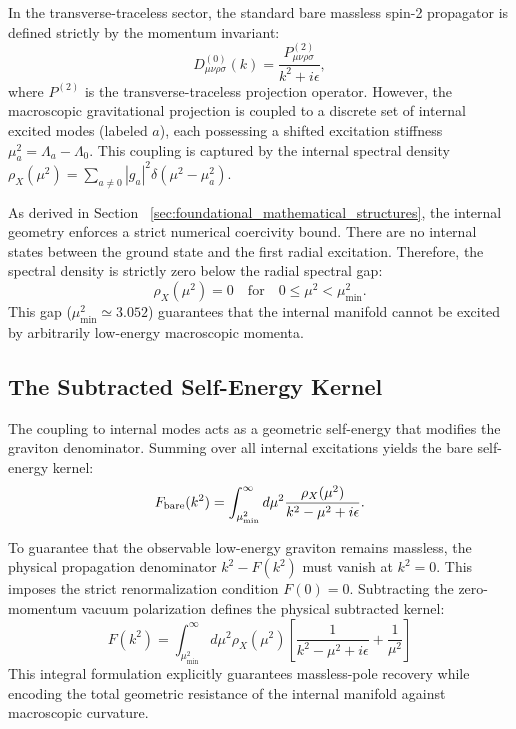 \documentclass[11pt]{article}
\begin{document}
In the transverse-traceless sector, the standard bare massless spin-2 propagator\cite{tHooft1974} is defined strictly by the momentum invariant:
\begin{equation}
D^{(0)}_{\mu\nu\rho\sigma}(k) = \frac{P_{\mu\nu\rho\sigma}^{(2)}}{k^2 + i\epsilon},
\end{equation}
where $P^{(2)}$ is the transverse-traceless projection operator. However, the macroscopic gravitational projection is coupled to a discrete set of internal excited modes (labeled $a$), each possessing a shifted excitation stiffness $\mu_a^2 = \Lambda_a - \Lambda_0$. This coupling is captured by the internal spectral density $\rho_X(\mu^2) = \sum_{a \neq 0} |g_a|^2 \delta(\mu^2 - \mu_a^2)$. 

As derived in Section ~\ref{sec:foundational_mathematical_structures}, the internal geometry enforces a strict numerical coercivity bound. There are no internal states between the ground state and the first radial excitation. Therefore, the spectral density\cite{Kallen1952} is strictly zero below the radial spectral gap:
\begin{equation}
\rho_X(\mu^2) = 0 \quad \text{for} \quad 0 \le \mu^2 < \mu_{\min}^2.
\end{equation}
This gap ($\mu_{\min}^2 \simeq 3.052$) guarantees that the internal manifold cannot be excited by arbitrarily low-energy macroscopic momenta.

\subsection{The Subtracted Self-Energy Kernel}
\label{sec:subtracted_self_energy}

The coupling to internal modes acts as a geometric self-energy that modifies the graviton denominator. Summing over all internal excitations yields the bare self-energy kernel:
\begin{equation}
F_{\rm bare}(k^2) = \int_{\mu_{\min}^2}^\infty d\mu^2 \frac{\rho_X(\mu^2)}{k^2 - \mu^2 + i\epsilon}.
\end{equation}

To guarantee that the observable low-energy graviton remains massless, the physical propagation denominator $k^2 - F(k^2)$ must vanish at $k^2 = 0$. This imposes the strict renormalization condition $F(0) = 0$. Subtracting the zero-momentum vacuum polarization defines the physical subtracted kernel:
\begin{equation}
\boxed{ F(k^2) = \int_{\mu_{\min}^2}^\infty d\mu^2 \rho_X(\mu^2) \left[ \frac{1}{k^2 - \mu^2 + i\epsilon} + \frac{1}{\mu^2} \right] }
\end{equation}
This integral formulation explicitly guarantees massless-pole recovery while encoding the total geometric resistance of the internal manifold against macroscopic curvature.
\end{document}
